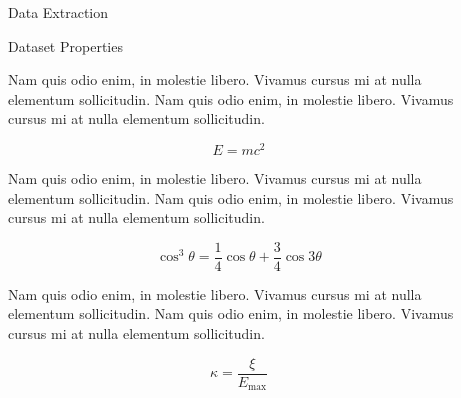 \documentclass[final,8pt]{beamer} %
\newlength{\sepwid}
\newlength{\onecolwid}
\newlength{\twocolwid}
\begin{document}
\begin{frame}[t]
\begin{columns}[t]
\begin{column}{\onecolwid}
\begin{block}{Data Extraction}
\end{block}


\begin{block}{Dataset Properties}

Nam quis odio enim, in molestie libero. Vivamus cursus mi at nulla elementum sollicitudin. Nam quis odio enim, in molestie libero. Vivamus cursus mi at nulla elementum sollicitudin.
  
\begin{equation}
E = mc^{2}
\label{eqn:Einstein}
\end{equation}

Nam quis odio enim, in molestie libero. Vivamus cursus mi at nulla elementum sollicitudin. Nam quis odio enim, in molestie libero. Vivamus cursus mi at nulla elementum sollicitudin.

\begin{equation}
\cos^3 \theta =\frac{1}{4}\cos\theta+\frac{3}{4}\cos 3\theta
\label{eq:refname}
\end{equation}

Nam quis odio enim, in molestie libero. Vivamus cursus mi at nulla elementum sollicitudin. Nam quis odio enim, in molestie libero. Vivamus cursus mi at nulla elementum sollicitudin.

\begin{equation}
\kappa =\frac{\xi}{E_{\mathrm{max}}} %
\end{equation}

\end{block}


\end{column} %



\begin{column}{\sepwid}\end{column} %

\begin{column}{\twocolwid} %



\end{column}
\end{columns}
\end{frame}
\end{document}

